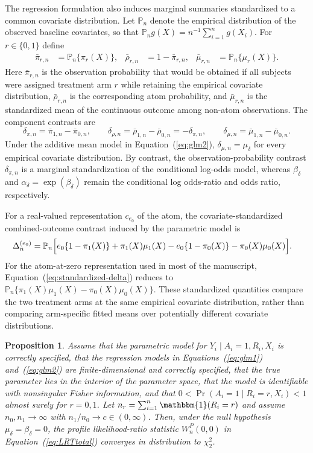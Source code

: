 \documentclass[11pt]{article}
\newtheorem{proposition}{Proposition}
\begin{document}
The regression formulation also induces marginal summaries standardized to a common covariate distribution. Let $\mathbb{P}_n$ denote the empirical distribution of the observed baseline covariates, so that $\mathbb{P}_n g(X) = n^{-1}\sum_{i=1}^n g(X_i)$. For $r \in \{0,1\}$ define
\begin{align}
  \bar{\pi}_{r,n}
  &=
  \mathbb{P}_n\{\pi_r(X)\},
  &
  \bar{\rho}_{r,n}
  &=
  1-\bar{\pi}_{r,n},
  &
  \bar{\mu}_{r,n}
  &=
  \mathbb{P}_n\{\mu_r(X)\}.
  \label{eq:standardized-components}
\end{align}
Here $\bar{\pi}_{r,n}$ is the observation probability that would be obtained if all subjects were assigned treatment arm $r$ while retaining the empirical covariate distribution, $\bar{\rho}_{r,n}$ is the corresponding atom probability, and $\bar{\mu}_{r,n}$ is the standardized mean of the continuous outcome among non-atom observations. The component contrasts are
\[
  \delta_{\pi,n} = \bar{\pi}_{1,n}-\bar{\pi}_{0,n},
  \qquad
  \delta_{\rho,n} = \bar{\rho}_{1,n}-\bar{\rho}_{0,n} = -\delta_{\pi,n},
  \qquad
  \delta_{\mu,n} = \bar{\mu}_{1,n}-\bar{\mu}_{0,n}.
\]
Under the additive mean model in Equation~(\ref{eq:glm2}), $\delta_{\mu,n} = \mu_\delta$ for every empirical covariate distribution. By contrast, the observation-probability contrast $\delta_{\pi,n}$ is a marginal standardization of the conditional log-odds model, whereas $\beta_\delta$ and $\alpha_\delta=\exp(\beta_\delta)$ remain the conditional log odds-ratio and odds ratio, respectively.

For a real-valued representation $c_{e_0}$ of the atom, the covariate-standardized combined-outcome contrast induced by the parametric model is
\begin{align}
  \Delta_n^{(e_0)}
  &=
  \mathbb{P}_n
  \Bigl[
    e_0\{1-\pi_1(X)\}
    + \pi_1(X)\mu_1(X)
    - e_0\{1-\pi_0(X)\}
    - \pi_0(X)\mu_0(X)
  \Bigr].
  \label{eq:standardized-delta}
\end{align}
For the atom-at-zero representation used in most of the manuscript, Equation~(\ref{eq:standardized-delta}) reduces to $\mathbb{P}_n\{\pi_1(X)\mu_1(X)-\pi_0(X)\mu_0(X)\}$. These standardized quantities compare the two treatment arms at the same empirical covariate distribution, rather than comparing arm-specific fitted means over potentially different covariate distributions.

\begin{proposition}
Assume that the parametric model for $Y_i \mid A_i = 1, R_i, X_i$ is correctly specified, that the regression models in Equations~(\ref{eq:glm1}) and~(\ref{eq:glm2}) are finite-dimensional and correctly specified, that the true parameter lies in the interior of the parameter space, that the model is identifiable with nonsingular Fisher information, and that $0 < \Pr(A_i = 1 \mid R_i = r, X_i) < 1$ almost surely for $r = 0,1$. Let $n_r = \sum_{i = 1}^n \mathbbm{1}(R_i = r)$ and assume $n_0, n_1 \to \infty$ with $n_1 / n_0 \to c \in (0,\infty)$. Then, under the null hypothesis $\mu_\delta = \beta_\delta = 0$, the profile likelihood-ratio statistic $W_n^P(0,0)$ in Equation~(\ref{eq:LRTtotal}) converges in distribution to $\chi^2_2$.
\end{proposition}
\end{document}
